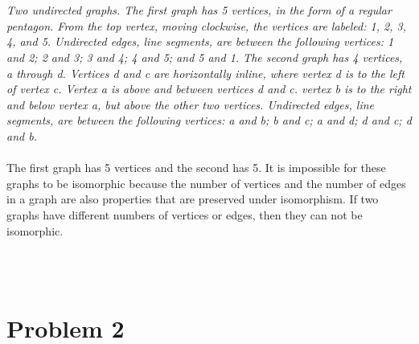 \documentclass{amsart}
\theoremstyle{definition}
\theoremstyle{Exercise}
\theoremstyle{remark}
\theoremstyle{rule}
\numberwithin{equation}{section}
\begin{document}
\begin{enumerate}[label=(\alph*)]
\\\\
{\color{blue}{\bf Figure 5:} \emph{Two undirected graphs. The first graph has 5 vertices, in the form of a regular pentagon. From the top vertex, moving clockwise, the vertices are labeled: 1, 2, 3, 4, and 5. Undirected edges, line segments, are between the following vertices: 1 and 2; 2 and 3; 3 and 4; 4 and 5; and 5 and 1. The second graph has 4 vertices, a through d. Vertices d and c are horizontally inline, where vertex d is to the left of vertex c. Vertex a is above and between vertices d and c. vertex b is to the right and below vertex a, but above the other two vertices. Undirected edges, line segments, are between the following vertices: a and b; b and c; a and d; d and c; d and b.
}
}
\\
\\
The first graph has 5 vertices and the second has 5.  It is impossible for these graphs to be isomorphic because the number of vertices and the number of edges in a graph are also properties that are preserved under isomorphism. If two graphs have different numbers of vertices or edges, then they can not be isomorphic.


\\\\

\end{enumerate}    
    
 \newpage

 

\section*{Problem 2}    
    
\end{document}

